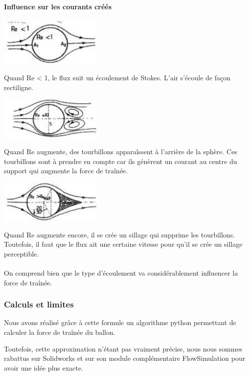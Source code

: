 \documentclass[a4paper,11pt]{article}
\begin{document}
\paragraph{Influence sur les courants créés}
	\begin{center}
		\includegraphics[width=5cm]{../Images/re0.jpg}
	\end{center}
	Quand Re < 1, le flux suit un écoulement de Stokes. L'air s'écoule de façon rectiligne.
	\begin{center}
		\includegraphics[width=5cm]{../Images/re1.jpg}
	\end{center}
	Quand Re augmente, des tourbillons apparaîssent à l’arrière de la sphère. Ces tourbillons sont à prendre en compte car ils génèrent un courant au centre du support qui augmente la force de traînée.
	\begin{center}
		\includegraphics[width=5cm]{../Images/re2.jpg}
	\end{center}
	Quand Re augmente encore, il se crée un sillage qui supprime les tourbillons.\\
	Toutefois, il faut que le flux ait une certaine vitesse pour qu'il se crée un sillage perceptible.\\
	\\
	On comprend bien que le type d'écoulement va considérablement influencer la force de traînée.


\subsubsection{Calculs et limites}
	Nous avons réalisé grâce à cette formule un algorithme python permettant de calculer la force de traînée du ballon.\\
	
	Toutefois, cette approximation n'étant pas vraiment précise, nous nous sommes rabattus sur Solidworks et sur son module complémentaire FlowSimulation pour avoir une idée plus exacte.
\end{document}
